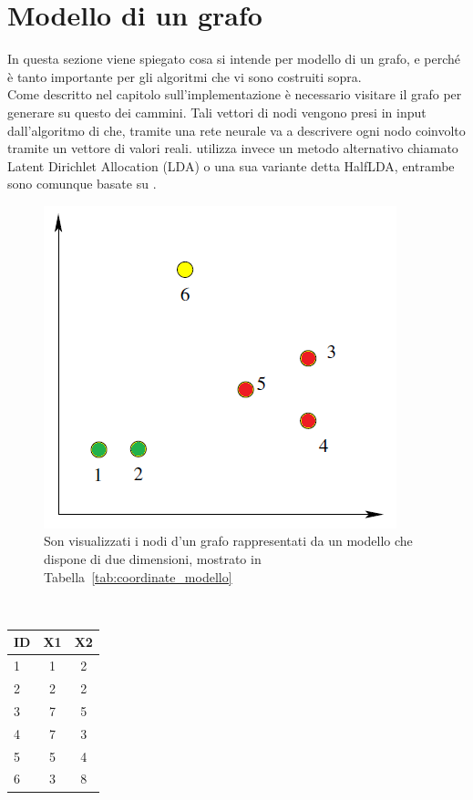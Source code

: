 \section{Modello di un grafo}
In questa sezione viene spiegato cosa si intende per modello di un grafo, e perché è tanto importante per gli algoritmi che vi sono costruiti sopra.\\
Come descritto nel capitolo sull'implementazione è necessario visitare il grafo per generare su questo dei cammini. Tali vettori di nodi vengono presi in input dall'algoritmo di \wv che, tramite una rete neurale va a descrivere ogni nodo coinvolto tramite un vettore di valori reali. \cnrl utilizza invece un metodo alternativo chiamato Latent Dirichlet Allocation (LDA)\cite{LDA} o una sua variante detta HalfLDA, entrambe sono comunque basate su \wv.\\
\begin{figure}[htp]
	\centering
	\includegraphics{immagini/punti_modello}
	\caption{Son visualizzati i nodi d'un grafo rappresentati da un modello che dispone di due dimensioni, mostrato in Tabella~\ref{tab:coordinate_modello}}
	\label{fig:grafico_modello}
\end{figure}
\\
\begin{center}
	\begin{tabular}{|l|cc|}
		\hline
		ID&X1&X2\\
		\hline
		1 & 1 & 2\\
		2 & 2 & 2\\
		3 & 7 & 5\\
		4 & 7 & 3\\
		5 & 5 & 4\\
		6 & 3 & 8\\
		\hline
	\end{tabular}
	\label{tab:coordinate_modello}
\end{center}
